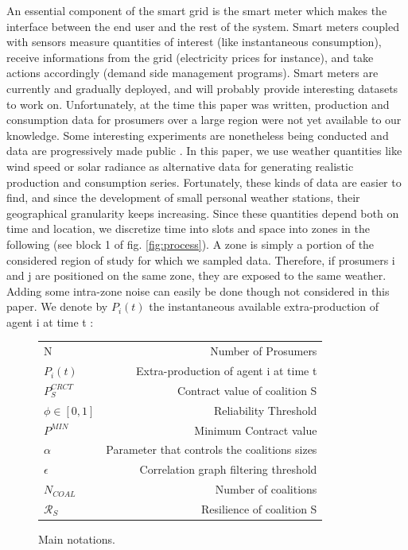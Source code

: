 \documentclass[journal]{IEEEtran}
\begin{document}
An essential component of the smart grid is the smart meter which makes the interface between the end user and the rest of the system. Smart meters coupled with sensors measure quantities of interest (like instantaneous consumption), receive informations from the grid (electricity prices for instance), and take actions accordingly (demand side management programs). Smart meters are currently and gradually deployed, and will probably provide interesting datasets to work on. Unfortunately, at the time this paper was written, production and consumption data for prosumers over a large region were not yet available to our knowledge. Some interesting experiments are nonetheless being conducted and data are progressively made public \cite{ISSDA}. In this paper, we use weather quantities like wind speed or solar radiance as alternative data for generating realistic production and consumption series. Fortunately, these kinds of data are easier to find, and since the development of small personal weather stations, their geographical granularity keeps increasing.  Since these quantities depend both on time and location, we discretize time into slots and space into zones in the following (see block 1 of fig. \ref{fig:process}). A zone is simply a portion of the considered region of study for which we sampled data. Therefore, if prosumers i and j are positioned on the same zone, they are exposed to the same weather. Adding some intra-zone noise can easily be done though not considered in this paper. We denote by $ P_{i}(t) $ the instantaneous available extra-production of agent i at time t :

\begin{figure}
	\begin{center}
		\begin{scriptsize}
		\label{tab:main_notations}
		\begin{tabular}{ | l | r | }
   						N & Number of Prosumers \\
  						$ P_i(t) $ & Extra-production of agent i at time t \\
   						$ P_S^{CRCT} $ & Contract value of coalition S \\
   						$ \phi \in \left[ 0,1 \right] $ & Reliability Threshold \\
   						$ P^{MIN} $ & Minimum Contract value \\
   						$ \alpha $ & Parameter that controls the coalitions sizes \\
   						$ \epsilon $ & Correlation graph filtering threshold \\
   						$ N_{COAL} $ & Number of coalitions \\
   						$ \mathcal{R}_S $ & Resilience of coalition S
 		\end{tabular}
 		\caption{Main notations.}
 	\end{scriptsize}
	\end{center}
\end{figure}
\end{document}
